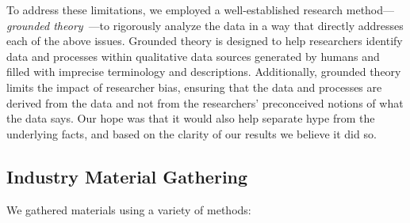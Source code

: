 To address these limitations, we employed a well-established research 
method---\emph{grounded 
theory}~\cite{corbin1990grounded,wolfswinkel2013using}---to rigorously analyze 
the data in a way that directly addresses each of the above issues.
Grounded theory is designed to help researchers identify data and processes 
within qualitative data sources generated by humans and filled with imprecise 
terminology and descriptions.
Additionally, grounded theory limits the impact of researcher bias, ensuring that the data and processes are derived from the data and not from the researchers' preconceived notions of what the data says.
Our hope was that it would also help separate hype from the underlying facts, 
and based on the clarity of our results we believe it did so.




\subsection{Industry Material Gathering}
We gathered materials using a variety of methods:

